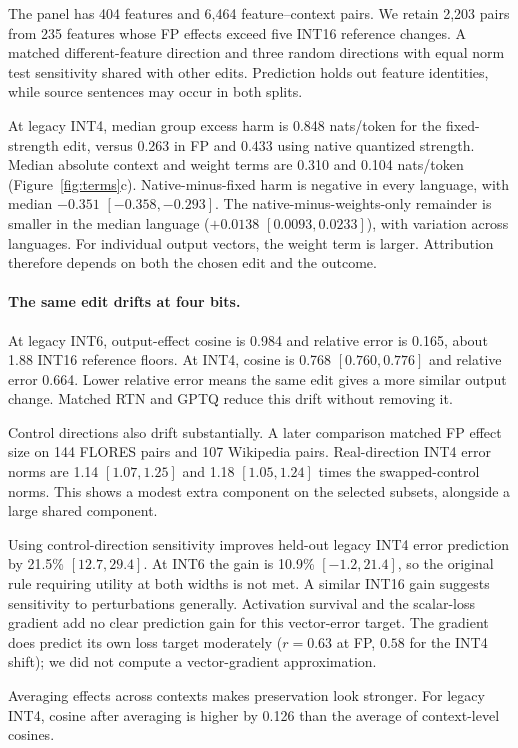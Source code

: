 \documentclass[11pt]{article}
\begin{document}
The panel has 404 features and 6,464 feature--context pairs. We retain 2,203 pairs from 235 features whose FP effects exceed five INT16 reference changes. A matched different-feature direction and three random directions with equal norm test sensitivity shared with other edits. Prediction holds out feature identities, while source sentences may occur in both splits.

At legacy INT4, median group excess harm is 0.848 nats/token for the fixed-strength edit, versus 0.263 in FP and 0.433 using native quantized strength. Median absolute context and weight terms are 0.310 and 0.104 nats/token (Figure~\ref{fig:terms}c). Native-minus-fixed harm is negative in every language, with median $-0.351$ $[-0.358,-0.293]$. The native-minus-weights-only remainder is smaller in the median language ($+0.0138$ $[0.0093,0.0233]$), with variation across languages. For individual output vectors, the weight term is larger. Attribution therefore depends on both the chosen edit and the outcome.


\paragraph{The same edit drifts at four bits.}
At legacy INT6, output-effect cosine is 0.984 and relative error is 0.165, about 1.88 INT16 reference floors. At INT4, cosine is 0.768 $[0.760,0.776]$ and relative error 0.664. Lower relative error means the same edit gives a more similar output change. Matched RTN and GPTQ reduce this drift without removing it.

Control directions also drift substantially. A later comparison matched FP effect size on 144 FLORES pairs and 107 Wikipedia pairs. Real-direction INT4 error norms are 1.14 $[1.07,1.25]$ and 1.18 $[1.05,1.24]$ times the swapped-control norms. This shows a modest extra component on the selected subsets, alongside a large shared component.

Using control-direction sensitivity improves held-out legacy INT4 error prediction by 21.5\% $[12.7,29.4]$. At INT6 the gain is 10.9\% $[-1.2,21.4]$, so the original rule requiring utility at both widths is not met. A similar INT16 gain suggests sensitivity to perturbations generally. Activation survival and the scalar-loss gradient add no clear prediction gain for this vector-error target. The gradient does predict its own loss target moderately ($r=0.63$ at FP, $0.58$ for the INT4 shift); we did not compute a vector-gradient approximation.

Averaging effects across contexts makes preservation look stronger. For legacy INT4, cosine after averaging is higher by 0.126 than the average of context-level cosines.
\end{document}

